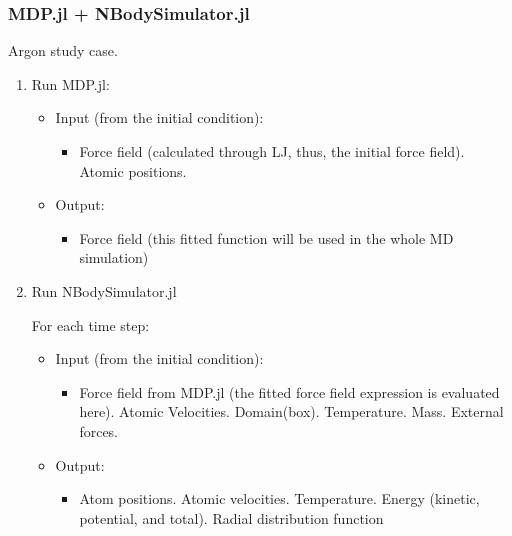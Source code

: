 \documentclass[10pt]{beamer}
\theoremstyle{remark}
\theoremstyle{definition}
\begin{document}
\begin{frame}
\frametitle{MDP.jl + NBodySimulator.jl}
\small
Argon study case.

\begin{enumerate}
    \item Run MDP.jl:
     	\begin{itemize}
    		\item Input (from the initial condition):
	    		\begin{itemize}
    			\item Force field (calculated through LJ, thus, the initial force field). Atomic positions.
	    		\end{itemize}
    		\item Output:
	    		\begin{itemize}
    			\item Force field (this fitted function will be used in the whole MD simulation)
	    		\end{itemize}
    	\end{itemize}
    \item Run NBodySimulator.jl
    
	    For each time step:
		\begin{itemize}
    		\item Input (from the initial condition):
	    		\begin{itemize}
    			\item Force field from MDP.jl (the fitted force field expression is evaluated here). Atomic Velocities. Domain(box). Temperature. Mass. External forces.
	    		\end{itemize}
    		\item Output:
	    		\begin{itemize}
    			\item Atom positions. Atomic velocities. Temperature. Energy (kinetic, potential, and total). Radial distribution function
	    		\end{itemize}
    	\end{itemize}
\end{enumerate}
\end{frame}
\end{document}
